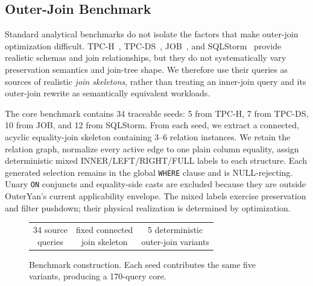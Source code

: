 \subsection{Outer-Join Benchmark}
\label{sec:outerjoin-benchmark}

Standard analytical benchmarks do not isolate the factors that make outer-join
optimization difficult. TPC-H~\cite{tpch}, TPC-DS~\cite{tpcds}, JOB~\cite{job},
and SQLStorm~\cite{sqlstorm25} provide realistic schemas and join relationships,
but they do not systematically vary preservation semantics and join-tree shape.
We therefore use their queries as sources of realistic \emph{join skeletons},
rather than treating an inner-join query and its outer-join rewrite as
semantically equivalent workloads.

The core benchmark contains 34 traceable seeds: 5 from TPC-H, 7 from TPC-DS,
10 from JOB, and 12 from SQLStorm. From each seed, we extract a connected,
acyclic equality-join skeleton containing 3--6 relation instances. We retain
the relation graph, normalize every active edge to one plain column equality,
assign deterministic mixed INNER/LEFT/RIGHT/FULL labels to each structure. Each generated selection remains in the global \texttt{WHERE}
clause and is NULL-rejecting. Unary \texttt{ON} conjuncts and equality-side
casts are excluded because they are outside OuterYan's current applicability
envelope. The mixed labels exercise preservation and filter pushdown; their physical
realization is determined by optimization.

\begin{figure}[t]
  \centering
  \small
  \begin{tabular}{c@{\;${}\longrightarrow{}$\;}c@{\;${}\longrightarrow{}$\;}c}
    \shortstack{34 source\\queries} &
    \shortstack{fixed connected\\join skeleton} &
    \shortstack{5 deterministic\\outer-join variants}
  \end{tabular}
  \caption{Benchmark construction. Each seed contributes the same five
  variants, producing a 170-query core.}
  \label{fig:outerjoin-benchmark-construction}
\end{figure}

